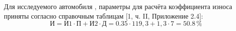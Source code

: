 Для исследуемого автомобиля , параметры для расчёта коэффициента износа приняты согласно справочным таблицам [1, ч. II, Приложение 2.4]:
\begin{equation}\label{eqsnosr}
\text{И} =\text{И1}\cdot\text{П}+\text{И2}\cdot \text{Д} = 0.35\cdot 119,3  + 1,3\cdot 7 = 50.8 \, \%\end{equation}
